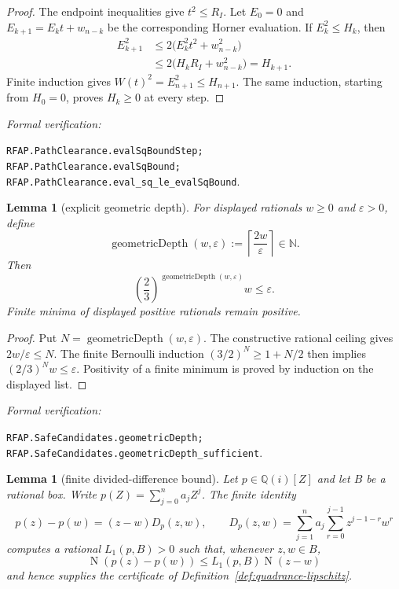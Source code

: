 \documentclass[11pt]{article}
\newtheorem{lemma}[theorem]{Lemma}
\newcommand{\Qi}{\mathbb{Q}(i)}
\newcommand{\N}{\mathbb{N}}
\newcommand{\Norm}[1]{\operatorname{N}\!\left(#1\right)}
\newcommand{\eps}{\varepsilon}
\newcommand{\Defref}[1]{Definition~\ref{#1}}
\newcommand{\leanref}[1]{\par\smallskip\noindent
  \emph{Formal verification:}\par\nobreak
  {\raggedright\nolinkurl{#1}.\par}}
\begin{document}
\begin{proof}
The endpoint inequalities give $t^2\le R_I$.  Let $E_0=0$ and
$E_{k+1}=E_kt+w_{n-k}$ be the corresponding Horner evaluation.  If
$E_k^2\le H_k$, then
\[
 \begin{aligned}
 E_{k+1}^2
   &\le 2\bigl(E_k^2t^2+w_{n-k}^2\bigr)\\
   &\le 2\bigl(H_kR_I+w_{n-k}^2\bigr)=H_{k+1}.
 \end{aligned}
\]
Finite induction gives $W(t)^2=E_{n+1}^2\le H_{n+1}$.  The same induction,
starting from $H_0=0$, proves $H_k\ge0$ at every step.
\end{proof}

\leanref{RFAP.PathClearance.evalSqBoundStep;
RFAP.PathClearance.evalSqBound;
RFAP.PathClearance.eval_sq_le_evalSqBound}

\begin{lemma}[explicit geometric depth]
\label{lem:reciprocal-search}
For displayed rationals $w\ge0$ and $\eps>0$, define
\[
 \operatorname{geometricDepth}(w,\eps)
       :=\left\lceil\frac{2w}{\eps}\right\rceil\in\N.
\]
Then
\[
 \left(\frac23\right)^{\operatorname{geometricDepth}(w,\eps)}w
       \le\eps.
\]
Finite minima of displayed positive rationals remain positive.
\end{lemma}

\begin{proof}
Put $N=\operatorname{geometricDepth}(w,\eps)$.
The constructive rational ceiling gives $2w/\eps\le N$.  The finite
Bernoulli induction
$(3/2)^N\ge1+N/2$ then implies
$(2/3)^Nw\le\eps$.  Positivity of a finite minimum is proved by induction on
the displayed list.
\end{proof}

\leanref{RFAP.SafeCandidates.geometricDepth;
RFAP.SafeCandidates.geometricDepth_sufficient}

\begin{lemma}[finite divided-difference bound]
\label{lem:divided-difference-bound}
Let $p\in\Qi[Z]$ and let $B$ be a rational box.  Write
$p(Z)=\sum_{j=0}^{n}a_jZ^j$.  The finite identity
\begin{equation}
\label{eq:divdiff}
 p(z)-p(w)=(z-w)D_p(z,w),\qquad
 D_p(z,w)=\sum_{j=1}^{n}a_j\sum_{r=0}^{j-1}z^{j-1-r}w^r
\end{equation}
computes a rational $L_1(p,B)>0$ such that, whenever $z,w\in B$,
\begin{equation}
\label{eq:lip1}
 \Norm{p(z)-p(w)}\le L_1(p,B)\Norm{z-w}
\end{equation}
and hence supplies the certificate of
\Defref{def:quadrance-lipschitz}.
\end{lemma}
\end{document}
